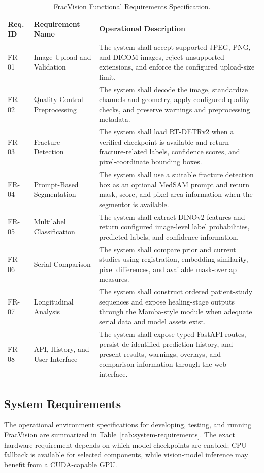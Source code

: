 \documentclass[12pt,a4paper]{article}
\begin{document}
\begingroup
\setcounter{table}{0}
\renewcommand{\thetable}{4.\arabic{table}}
\begin{table}[H]
\centering
\small
\caption{FracVision Functional Requirements Specification.}
\label{tab:functional-requirements}
\begin{tabularx}{\textwidth}{|p{}|p{}|X|}
\hline
\textbf{Req. ID} & \textbf{Requirement Name} & \textbf{Operational Description}\\\hline
FR-01 & Image Upload and Validation & The system shall accept supported JPEG, PNG, and DICOM images, reject unsupported extensions, and enforce the configured upload-size limit.\\\hline
FR-02 & Quality-Control Preprocessing & The system shall decode the image, standardize channels and geometry, apply configured quality checks, and preserve warnings and preprocessing metadata.\\\hline
FR-03 & Fracture Detection & The system shall load RT-DETRv2 when a verified checkpoint is available and return fracture-related labels, confidence scores, and pixel-coordinate bounding boxes.\\\hline
FR-04 & Prompt-Based Segmentation & The system shall use a suitable fracture detection box as an optional MedSAM prompt and return mask, score, and pixel-area information when the segmentor is available.\\\hline
FR-05 & Multilabel Classification & The system shall extract DINOv2 features and return configured image-level label probabilities, predicted labels, and confidence information.\\\hline
FR-06 & Serial Comparison & The system shall compare prior and current studies using registration, embedding similarity, pixel differences, and available mask-overlap measures.\\\hline
FR-07 & Longitudinal Analysis & The system shall construct ordered patient-study sequences and expose healing-stage outputs through the Mamba-style module when adequate serial data and model assets exist.\\\hline
FR-08 & API, History, and User Interface & The system shall expose typed FastAPI routes, persist de-identified prediction history, and present results, warnings, overlays, and comparison information through the web interface.\\\hline
\end{tabularx}
\end{table}

\subsection{System Requirements}
The operational environment specifications for developing, testing, and running FracVision are summarized in Table~\ref{tab:system-requirements}. The exact hardware requirement depends on which model checkpoints are enabled; CPU fallback is available for selected components, while vision-model inference may benefit from a CUDA-capable GPU.
\end{document}
